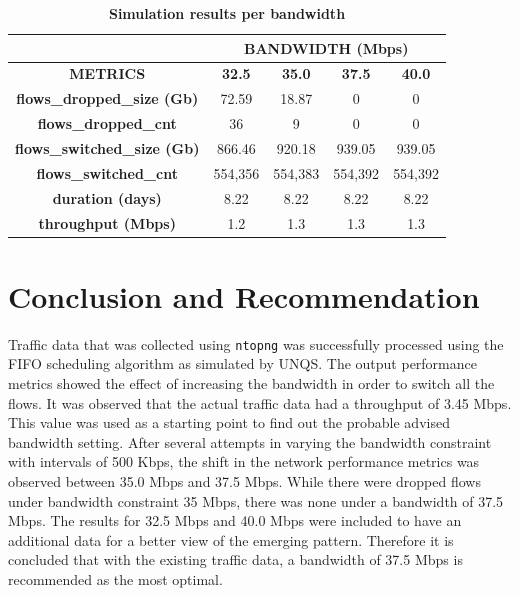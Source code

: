 \documentclass[journal]{IEEE/IEEEtran}
\begin{document}
\begin{table}[ht]
\centering
\caption{\textbf{Simulation results per bandwidth}}
\label{simulation_res_per_bw}
\begin{tabular}{|c|c|c|c|c|}
\hline
                                  & \multicolumn{4}{c}{\textbf{BANDWIDTH (Mbps)}} \\ \hline
\textbf{METRICS}                  & \textbf{32.5}   & \textbf{35.0}  & \textbf{37.5} & \textbf{40.0}   \\ \hline
\textbf{flows\_dropped\_size (Gb)}  & 72.59           & 18.87 & 0& 0   \\ \hline
\textbf{flows\_dropped\_cnt}        & 36              & 9& 0& 0   \\ \hline    
\textbf{flows\_switched\_size (Gb)} & 866.46          & 920.18 &939.05 & 939.05    \\ \hline
\textbf{flows\_switched\_cnt}       & 554,356         &554,383&554,392&554,392
    \\ \hline
\textbf{duration (days)}          & 8.22            & 8.22& 8.22&8.22    \\ \hline
\textbf{throughput (Mbps)}        & 1.2             & 1.3& 1.3& 1.3    \\ \hline
\end{tabular}
\end{table}


\section{Conclusion and Recommendation}

Traffic data that was collected using \texttt{ntopng} was successfully processed using the FIFO scheduling algorithm as simulated by UNQS. The output performance metrics showed the effect of increasing the bandwidth in order to switch all the flows. It was observed that the actual traffic data had a throughput of 3.45 Mbps. This value was used as a starting point to find out the probable advised bandwidth setting. After several attempts in varying the bandwidth constraint with intervals of 500 Kbps, the shift in the network performance metrics was observed between 35.0 Mbps and 37.5 Mbps.  While there were dropped flows under bandwidth constraint 35 Mbps, there was none under a bandwidth of 37.5 Mbps. The results for 32.5 Mbps and 40.0 Mbps were included to have an additional data for a better view of the emerging pattern. Therefore it is concluded that with the existing traffic data, a bandwidth of 37.5 Mbps is recommended as the most optimal.
\end{document}

